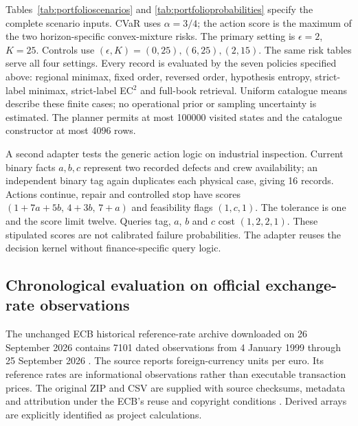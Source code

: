 \documentclass[11pt,a4paper]{article}
\theoremstyle{definition}\newtheorem{definition}[theorem]{Definition}
\begin{document}
\begin{table}[!htbp]\centering\small
\caption{Constructed cumulative loss factors. Columns within each horizon are equity, rate-sensitive notional, credit and liquidity. Negative values represent gains in the corresponding linear exposure.}\label{tab:portfolioscenarios}

\end{table}
\begin{table}[!htbp]\centering\small
\caption{The three stipulated scenario distributions. Each column sums to one. Their convex hull is the ambiguity set at each horizon; these probabilities are not estimated frequencies.}\label{tab:portfolioprobabilities}

\end{table}
Tables~\ref{tab:portfolioscenarios} and \ref{tab:portfolioprobabilities} specify the complete scenario inputs. CVaR uses $\alpha=3/4$; the action score is the maximum of the two horizon-specific convex-mixture risks. The primary setting is $\epsilon=2$, $K=25$. Controls use $(\epsilon,K)=(0,25),(6,25),(2,15)$. The same risk tables serve all four settings. Every record is evaluated by the seven policies specified above: regional minimax, fixed order, reversed order, hypothesis entropy, strict-label minimax, strict-label EC$^2$ and full-book retrieval. Uniform catalogue means describe these finite cases; no operational prior or sampling uncertainty is estimated. The planner permits at most 100000 visited states and the catalogue constructor at most 4096 rows.

A second adapter tests the generic action logic on industrial inspection. Current binary facts $a,b,c$ represent two recorded defects and crew availability; an independent binary tag again duplicates each physical case, giving 16 records. Actions continue, repair and controlled stop have scores $(1+7a+5b,\,4+3b,\,7+a)$ and feasibility flags $(1,c,1)$. The tolerance is one and the score limit twelve. Queries tag, $a$, $b$ and $c$ cost $(1,2,2,1)$. These stipulated scores are not calibrated failure probabilities. The adapter reuses the decision kernel without finance-specific query logic.


\subsection{Chronological evaluation on official exchange-rate observations}\label{sec:ecbprotocol}
The unchanged ECB historical reference-rate archive downloaded on 26 September 2026 contains 7101 dated observations from 4 January 1999 through 25 September 2026 \cite{ecb2026fx}. The source reports foreign-currency units per euro. Its reference rates are informational observations rather than executable transaction prices. The original ZIP and CSV are supplied with source checksums, metadata and attribution under the ECB's reuse and copyright conditions \cite{ecb2026reuse,ecb2026copyright}. Derived arrays are explicitly identified as project calculations.
\end{document}
